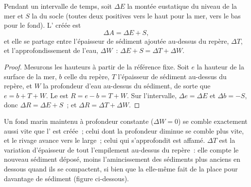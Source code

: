 \begin{proposition}\label{prop:b1:diagenesis-basins:budget}
Pendant un intervalle de temps, soit $\Delta E$ la montée eustatique du niveau de la mer et $S$
la  du socle (toutes deux positives vers le haut pour la mer, vers le bas pour
le fond). L' créée est
\[
  \Delta A = \Delta E + S ,
\]
et elle se partage entre l'épaisseur de sédiment ajoutée au-dessus du repère,
$\Delta T$, et l'approfondissement de l'eau, $\Delta W$~:
$\Delta E + S = \Delta T + \Delta W$.
\end{proposition}

\begin{proof}
Mesurons les hauteurs à partir de la référence fixe. Soit $e$ la hauteur de la surface de la
mer, $b$ celle du repère, $T$ l'épaisseur de sédiment au-dessus du repère,
et $W$ la profondeur d'eau au-dessus du sédiment, de sorte que $e = b + T + W$. Le
 est $R = e - b = T + W$. Sur l'intervalle, $\Delta e =
\Delta E$ et $\Delta b = -S$, donc $\Delta R = \Delta E + S$~; et $\Delta R =
\Delta T + \Delta W$.
\end{proof}

Un fond marin maintenu à profondeur constante ($\Delta W = 0$) se comble exactement aussi vite
que l' est créée~; celui dont la profondeur diminue se comble plus vite, et le
rivage avance vers le large~; celui qui s'approfondit est affamé. $\Delta T$ est la
variation d'épaisseur de tout l'empilement au-dessus du repère~: elle compte le nouveau
sédiment déposé, moins l'amincissement des sédiments plus anciens en dessous quand ils
se compactent, si bien que la  elle-même fait de la place pour davantage de sédiment (figure ci-dessous).

